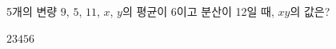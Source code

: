 5개의 변량 $9$, $5$, $11$, $x$, $y$의 평균이 6이고 분산이 12일 때, $xy$의 값은?
\begin{choices32}{$2$}{$3$}{$4$}{$5$}{$6$}\end{choices32}
